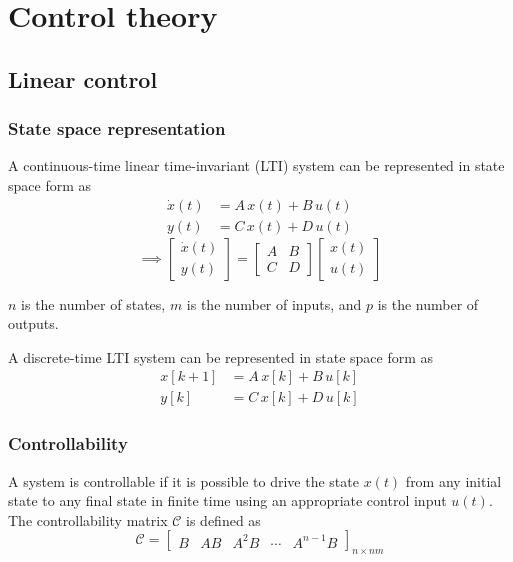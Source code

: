 
\part{Control theory}

\chapter{Linear control}

\section{State space representation}

A continuous-time linear time-invariant (LTI) system can be represented in state space form as
\begin{align*}
    \dot{x}(t)
    & =
    A \, x(t) + B \, u(t)
    \\
    y(t)
    & =
    C \, x(t) + D \, u(t)
\end{align*}
\begin{equation*}
    \implies
    \begin{bmatrix}
        \dot{x}(t) \\
        y(t)
    \end{bmatrix}
    =
    \begin{bmatrix}
        A & B \\
        C & D
    \end{bmatrix}
    \begin{bmatrix}
        x(t) \\
        u(t)
    \end{bmatrix}
\end{equation*}

\( n \) is the number of states, \( m \) is the number of inputs, and \( p \) is the number of outputs.

A discrete-time LTI system can be represented in state space form as
\begin{align*}
    x[k+1]
    & =
    A \, x[k] + B \, u[k]
    \\
    y[k]
    & =
    C \, x[k] + D \, u[k]
\end{align*}

\section{Controllability}

A system is controllable if it is possible to drive the state \(x(t)\) from any initial state to any final state in finite time using an appropriate control input \( u(t) \).
The controllability matrix \( \mathcal{C} \) is defined as
\begin{equation*}
    \mathcal{C}
    =
    \begin{bmatrix}
        B & A B & A^2 B & \cdots & A^{n-1} B
    \end{bmatrix}_{n \times nm}
\end{equation*}

